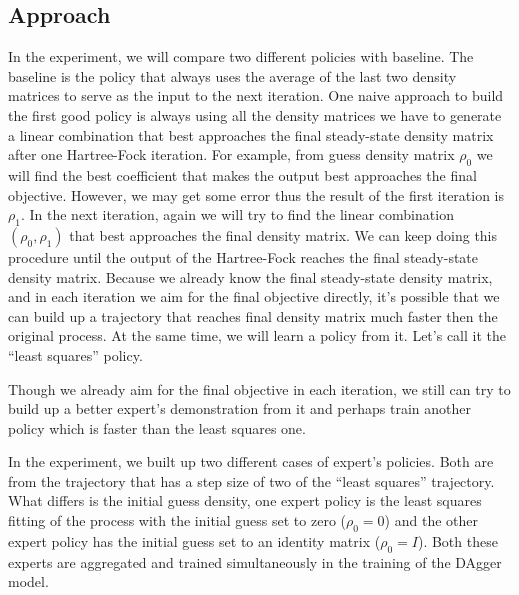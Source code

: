 \documentclass[twoside,11pt]{article}
\begin{document}


\subsection{Approach}


In the experiment, we will compare two different policies with baseline. The baseline is the policy that always uses the average of the last two density matrices to serve as the input to the next iteration.
One naive approach to build the first good policy is always using all the density matrices we have to generate a linear combination that best approaches the final steady-state density matrix after one Hartree-Fock iteration.  For example, from guess density matrix $\rho_0$ we will find the best coefficient that makes the output best approaches the final objective. However, we may get some error thus the result of the first iteration is $\rho_1$.  In the next iteration, again we will try to find the linear combination $(\rho_0, \rho_1)$ that best approaches the final density matrix. We can keep doing this procedure until the output of the Hartree-Fock reaches the final steady-state density matrix.
Because we already know the final steady-state density matrix, and in each iteration we aim for the final objective directly, it's possible that we can build up a trajectory that reaches final density matrix much faster then the original process. At the same time, we will learn a policy from it. Let's call it the ``least squares'' policy.

Though we already aim for the final objective in each iteration, we still can try to build up a better expert's demonstration from it and perhaps train another policy which is faster than the least squares one.

In the experiment, we built up two different cases of expert's policies. Both are from the trajectory that has a step size of two of the ``least squares'' trajectory. What differs is the initial guess density, one expert policy is the least squares fitting of the process with the initial guess set to zero ($\rho_0 = 0$) and the other expert policy has the initial guess set to an identity matrix ($\rho_0 = I$). Both these experts are aggregated and trained simultaneously in the training of the DAgger model. 
\end{document}
